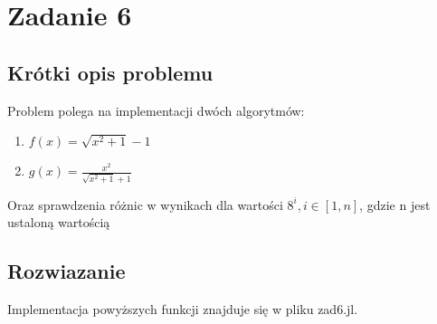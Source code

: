 \documentclass[a4paper,14pt]{report}
\begin{document}
\chapter{Zadanie 6}
\section{Krótki opis problemu}
Problem polega na implementacji dwóch algorytmów:
\begin{enumerate}
  \item $f(x)= \sqrt{x^{2}+1}-1 $
  \item $g(x)=\frac{x^2}{ \sqrt{x^{2}+1}+1}$
  \end{enumerate}
  Oraz sprawdzenia różnic w wynikach dla wartości $8^{i}, i \in [1,n] $, gdzie n jest ustaloną wartością
\section{Rozwiazanie}
Implementacja powyższych funkcji znajduje się w pliku zad6.jl.
\end{document}

